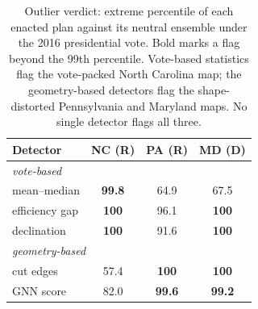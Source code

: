 \begin{table}[t]
\caption{Outlier verdict: extreme percentile of each enacted plan against its
neutral ensemble under the 2016 presidential vote. Bold marks a flag beyond the
99th percentile. Vote-based statistics flag the vote-packed North Carolina map;
the geometry-based detectors flag the shape-distorted Pennsylvania and Maryland
maps. No single detector flags all three.}
\label{tab:verdict}
\centering
\footnotesize
\begin{tabular}{lccc}
\toprule
Detector & NC (R) & PA (R) & MD (D) \\
\midrule
\multicolumn{4}{l}{\itshape vote-based} \\
\quad mean--median   & \textbf{99.8} & 64.9          & 67.5 \\
\quad efficiency gap & \textbf{100}  & 96.1          & \textbf{100} \\
\quad declination    & \textbf{100}  & 91.6          & \textbf{100} \\
\midrule
\multicolumn{4}{l}{\itshape geometry-based} \\
\quad cut edges      & 57.4          & \textbf{100}  & \textbf{100} \\
\quad GNN score      & 82.0          & \textbf{99.6} & \textbf{99.2} \\
\bottomrule
\end{tabular}
\end{table}
